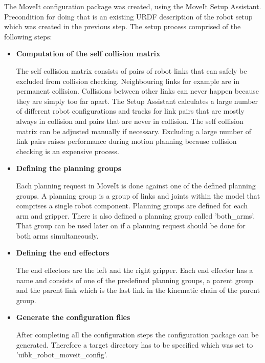 The MoveIt configuration package was created, using the MoveIt Setup Assistant. Precondition for doing that is an existing URDF description of the robot setup which was created in the previous step.
The setup process comprised of the following steps:

\begin{itemize}

\item \textbf{Computation of the self collision matrix}

The self collision matrix consists of pairs of robot links that can safely be excluded from collision checking. Neighbouring links for example are in permanent collision. Collisions between other links can never happen because they are simply too far apart. The Setup Assistant calculates a large number of different robot configurations and tracks for link pairs that are mostly always in collision and pairs that are never in collision. The self collision matrix can be adjusted manually if necessary. Excluding a large number of link pairs raises performance during motion planning because collision checking is an expensive process.

\item \textbf{Defining the planning groups}

Each planning request in MoveIt is done against one of the defined planning groups. A planning group is a group of links and joints within the model that comprises a single robot component. Planning groups are defined for each arm and gripper. There is also defined a planning group called 'both\_arms'. That group can be used later on if a planning request should be done for both arms simultaneously.

\item \textbf{Defining the end effectors}

The end effectors are the left and the right gripper. Each end effector has a name and consists of one of the predefined planning groups, a parent group and the parent link which is the last link in the kinematic chain of the parent group.

\item \textbf{Generate the configuration files}

After completing all the configuration steps the configuration package can be generated. Therefore a target directory has to be specified which was set to 'uibk\_robot\_moveit\_config'.

\end{itemize}

